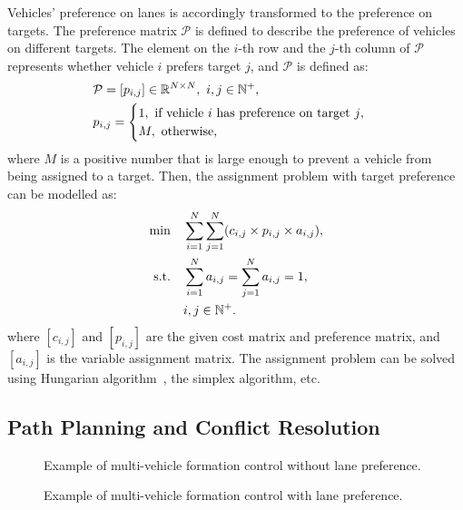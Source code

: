 \documentclass[journal]{IEEEtranTIE}
\begin{document}
Vehicles' preference on lanes is accordingly transformed to the preference on targets. The preference matrix $\mathcal{P}$ is defined to describe the preference of vehicles on different targets. The element on the $i$-th row and the $j$-th column of $\mathcal{P}$ represents whether vehicle $i$ prefers target $j$, and $\mathcal{P}$ is defined as:
\begin{eqnarray}
&\mathcal{P}=[p_{i,j}]\in \mathbb{R}^{N\times N},\ i,j\in \mathbb{N}^+, \ \\
&p_{i,j}=
\begin{cases}
1, \ \text{if vehicle $i$ has preference on target $j$},\notag \\
M, \ \text{otherwise},
\end{cases}
\end{eqnarray}
where $M$ is a positive number that is large enough to prevent a vehicle from being assigned to a target. Then, the assignment problem with target preference can be modelled as:
\begin{alignat}{2}
\min\quad & \sum_{i=1}^N\sum_{j=1}^N (c_{i,j}\times p_{i,j}\times a_{i,j}),\label{eqn - lp2}\\
\mbox{s.t.}\quad
&\sum_{i=1}^N a_{i,j}=\sum_{j=1}^N a_{i,j}=1,\notag \\
&i,j\in \mathbb{N}^+.\notag
\end{alignat}
where $[c_{i,j}]$ and $[p_{i,j}]$ are the given cost matrix and preference matrix, and $[a_{i,j}]$ is the variable assignment matrix. The assignment problem can be solved using Hungarian algorithm~\cite{19kuhn1955hungarian}, the simplex algorithm, etc.




%
\subsection{Path Planning and Conflict Resolution}
\label{pathplanning}
%

\begin{figure*}
\begin{center}
    \caption{Example of multi-vehicle formation control without lane preference.}
    \label{example1}
\end{center}
\end{figure*}
\begin{figure*}
\begin{center}
    \caption{Example of multi-vehicle formation control with lane preference.}
    \label{example2}
\end{center}
\end{figure*}
\end{document}

